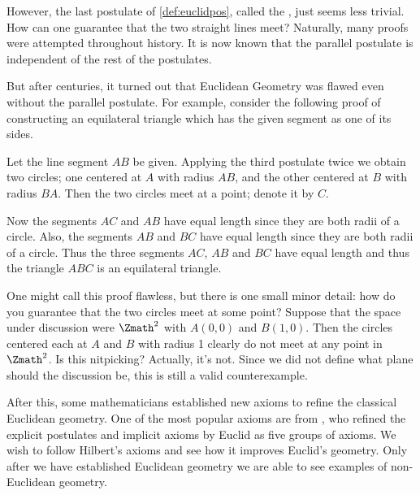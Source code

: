 However, the last postulate of \cref{def:euclidpos},
called the ,
just seems less trivial.
How can one guarantee that the two straight lines meet?
Naturally, many proofs were attempted throughout history.
It is now known that
the parallel postulate is independent of the rest of the postulates.

But after centuries, it turned out that
Euclidean Geometry was flawed even without the parallel postulate.
For example,
consider the following proof of constructing an equilateral triangle
which has the given segment as one of its sides.

\begin{example}
    \label{exm:equitri}
    Let the line segment \(AB\) be given.
    Applying the third postulate twice
    we obtain two circles;
    one centered at \(A\) with radius \(AB\),
    and the other centered at \(B\) with radius \(BA\).
    Then the two circles meet at a point;
    denote it by \(C\).
    
    Now the segments \(AC\) and \(AB\) have equal length
    since they are both radii of a circle.
    Also, the segments \(AB\) and \(BC\) have equal length
    since they are both radii of a circle.
    Thus the three segments \(AC\), \(AB\) and \(BC\) have equal length
    and thus the triangle \(ABC\) is an equilateral triangle.
\end{example}

One might call this proof flawless,
but there is one small minor detail:
how do you guarantee that the two circles meet at some point?
Suppose that the space under discussion were \(\Zmath^2\)
with \(A(0,0)\) and \(B(1,0)\).
Then the circles centered each at \(A\) and \(B\) with radius 1
clearly do not meet at any point in \(\Zmath^2\).
Is this nitpicking?
Actually, it's not.
Since we did not define what plane should the discussion be,
this is still a valid counterexample.

After this, some mathematicians established new axioms
to refine the classical Euclidean geometry.
One of the most popular axioms are from
\textcite{Hil05},
who refined the explicit postulates and implicit axioms by Euclid
as five groups of axioms.
We wish to follow Hilbert's axioms
and see how it improves Euclid's geometry.
Only after we have established Euclidean geometry
we are able to see examples of non-Euclidean geometry.